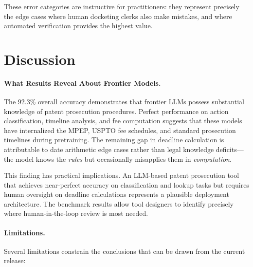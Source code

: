 \documentclass[11pt]{article}
\begin{document}
These error categories are instructive for practitioners: they represent precisely the edge cases where human docketing clerks also make mistakes, and where automated verification provides the highest value.

\section{Discussion}
\label{sec:discussion}

\paragraph{What Results Reveal About Frontier Models.}
The 92.3\% overall accuracy demonstrates that frontier LLMs possess substantial knowledge of patent prosecution procedures. Perfect performance on action classification, timeline analysis, and fee computation suggests that these models have internalized the MPEP, USPTO fee schedules, and standard prosecution timelines during pretraining. The remaining gap in deadline calculation is attributable to date arithmetic edge cases rather than legal knowledge deficits---the model knows the \emph{rules} but occasionally misapplies them in \emph{computation}.

This finding has practical implications. An LLM-based patent prosecution tool that achieves near-perfect accuracy on classification and lookup tasks but requires human oversight on deadline calculations represents a plausible deployment architecture. The benchmark results allow tool designers to identify precisely where human-in-the-loop review is most needed.

\paragraph{Limitations.}
Several limitations constrain the conclusions that can be drawn from the current release:
\end{document}
